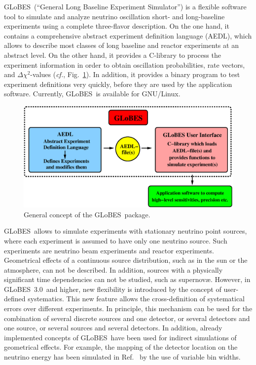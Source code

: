 \documentclass[12pt,a4paper]{article}
\newcommand{\cf}{{\it cf.}}
\newcommand{\fig}{Fig.}
\newcommand{\Ref}{Ref.}
\newcommand{\GLOBES}{{\sf GLoBES}}
\newcommand{\GLOBESN}{{\sf GLoBES~3.0}}
\newcommand{\AEDL}{{\sf AEDL}}
\newcommand{\figu}[1]{\fig~\ref{fig:#1}}
\begin{document}
\GLOBES\ (``General Long Baseline Experiment Simulator'') is a flexible
software tool to simulate and analyze neutrino oscillation 
short- and long-baseline experiments using a 
complete three-flavor description. On the
one hand, it contains a comprehensive abstract experiment definition
language (\AEDL ), which allows to describe 
most classes of long baseline and reactor experiments
at an abstract level. On the other hand, it provides a C-library to 
process the experiment information in order to obtain oscillation
probabilities, rate vectors, and $\Delta \chi^2$-values (\cf, \figu{GLOBES}). 
In addition, it provides a binary program to test experiment
definitions very quickly, before they are used by the application software.
Currently, \GLOBES\ is available for GNU/Linux. 

\begin{figure}[t]
\begin{center}
\includegraphics[width=14cm]{GLOBES}
\end{center}
\caption{\label{fig:GLOBES} General concept of the \GLOBES\ package.}
\end{figure}

\GLOBES\ allows to simulate experiments with stationary neutrino point 
sources, where each experiment is assumed to have only one neutrino source.
Such experiments are neutrino beam experiments and reactor experiments. 
Geometrical effects of a continuous source distribution, such as in the sun or the 
atmosphere, can not be described. In addition, sources with a physically 
significant time dependencies can not be studied, such as  supernov\ae. 
However, in \GLOBESN\ and higher, new flexibility is introduced by the
concept of user-defined systematics. This new feature allows the cross-definition
of systematical errors over different experiments. In principle, 
this mechanism can be used for the combination of several discrete sources
and one detector, or several detectors and one source, or several sources and
several detectors. In addition, already implemented
concepts of \GLOBES\ have been used for indirect simulations of geometrical
effects. For example, the mapping of the detector location on the neutrino
energy has been simulated in \Ref~\cite{Rolinec:2006xr} by the use of
variable bin widths.
\end{document}
